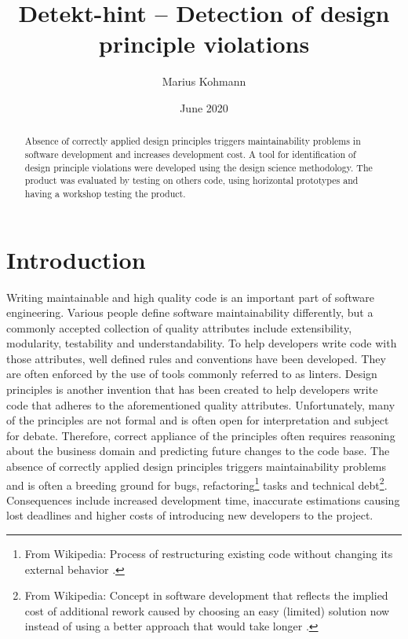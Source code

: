 \documentclass{article}
\title{Detekt-hint -- Detection of design principle violations}
\author{Marius Kohmann}
\date{June 2020}
\begin{document}
\maketitle

\begin{abstract}
	Absence of correctly applied design principles triggers maintainability problems in software development and increases development cost. A tool for identification of design principle violations were developed using the design science methodology. The product was evaluated by testing on others code, using horizontal prototypes and having a workshop testing the product. 
	
	
	
\end{abstract}


\clearpage
\tableofcontents
\clearpage
\section{Introduction}

Writing maintainable and high quality code is an important part of software engineering. Various people define software maintainability differently, but a commonly accepted collection of quality attributes include extensibility, modularity, testability and understandability. To help developers write code with those attributes, well defined rules and conventions have been developed. They are often enforced by the use of tools commonly referred to as linters. Design principles is another invention that has been created to help developers write code that adheres to the aforementioned quality attributes. Unfortunately, many of the principles are not formal and is often open for interpretation and subject for debate. Therefore, correct appliance of the principles often requires reasoning about the business domain and predicting future changes to the code base. The absence of correctly applied design principles triggers maintainability problems and is often a breeding ground for bugs, refactoring\footnote{From Wikipedia: Process of restructuring existing code without changing its external behavior \cite{refactoring}.} tasks and technical debt\footnote{From Wikipedia: Concept in software development that reflects the implied cost of additional rework caused by choosing an easy (limited) solution now instead of using a better approach that would take longer \cite{technicalDebt}.}. Consequences include increased development time, inaccurate estimations causing lost deadlines and higher costs of introducing new developers to the project.
\end{document}
